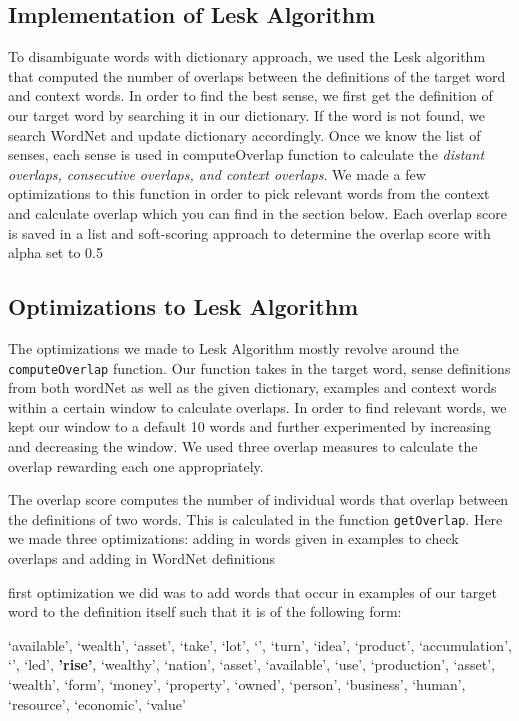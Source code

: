 \documentclass{article}
\begin{document}
\subsection{Implementation of Lesk Algorithm}
To disambiguate words with dictionary approach, we used the Lesk algorithm that computed the number of overlaps between the definitions of the target word and context words. In order to find the best sense, we first get the definition of our target word by searching it in our dictionary. If the word is not found, we search WordNet and update dictionary accordingly. Once we know the list of senses, each sense is used in computeOverlap function to calculate the \emph{distant overlaps, consecutive overlaps, and context overlaps}. We made a few optimizations to this function in order to pick relevant words from the context and calculate overlap which you can find in the section below. Each overlap score is saved in a list and soft-scoring approach to determine the overlap score with alpha set to 0.5

\subsection{Optimizations to Lesk Algorithm}
The optimizations we made to Lesk Algorithm mostly revolve around the \texttt{computeOverlap} function. Our function takes in the target word, sense definitions from both wordNet as well as the given dictionary, examples and context words within a certain window to calculate overlaps. In order to find relevant words, we kept our window to a default 10 words and further experimented by increasing and decreasing the window. We used three overlap measures to calculate the overlap rewarding each one appropriately. 

The overlap score computes the number of individual words that overlap between the definitions of two words. This is calculated in the function \texttt{getOverlap}. Here we made three optimizations: adding in words given in examples to check overlaps and adding in WordNet definitions

first optimization we did was to add words that occur in examples of our target word to the definition itself such that it is of the following form: 

\lbrack `available', `wealth', `asset', `take', `lot', `', `turn', `idea', `product', `accumulation', `', `led', \textbf{'rise'}, `wealthy', `nation', `asset', `available', `use', `production', `asset', `wealth', `form', `money', `property', `owned', `person', `business', `human', `resource', `economic', `value'\rbrack
\end{document}
